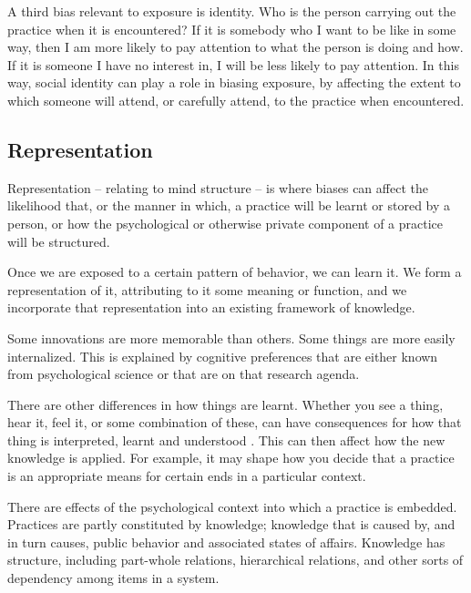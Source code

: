 A third bias relevant to exposure is identity.  Who is the person carrying out the practice when 
it is encountered? If it is somebody who I want to be like in some 
way, then I am more likely to pay attention to what the person is doing 
and how. If it is someone I have no interest in, I will be less likely to pay attention. In this way, social 
identity can play a role in biasing exposure, by affecting the extent to 
which someone will attend, or carefully attend, to the practice when 
encountered.


\subsection{Representation}
Representation -- relating to mind structure -- is where biases can 
affect the likelihood that, or the manner in which, a practice will be 
learnt or stored by a person, or how the psychological or otherwise 
private component of a practice will be structured. 



Once we are exposed to a certain pattern of behavior, we can 
learn it. We form a representation of it, attributing to it some meaning 
or function, and we incorporate that representation into an existing framework of knowledge. 



Some innovations are more memorable than others. Some things are more easily internalized. This is explained by cognitive preferences that are either known from 
psychological science or that are on that research agenda. 



There are other differences in how things are learnt. Whether you see a thing, hear it, feel it, or some combination of these, can have 
consequences for how that thing is interpreted, learnt and understood 
\citep[Chapter 6]{enfield_anatomy_2009}. This can then affect how the new knowledge is applied. For example, it may shape how you decide that a practice 
is an appropriate means for certain ends in a particular context.



There are effects of the psychological context into which a practice is 
embedded. Practices are partly constituted by knowledge; knowledge that 
is caused by, and in turn causes, public behavior and associated states 
of affairs. Knowledge has structure, including part-whole relations, hierarchical 
relations, and other sorts of dependency among items in a system. 



